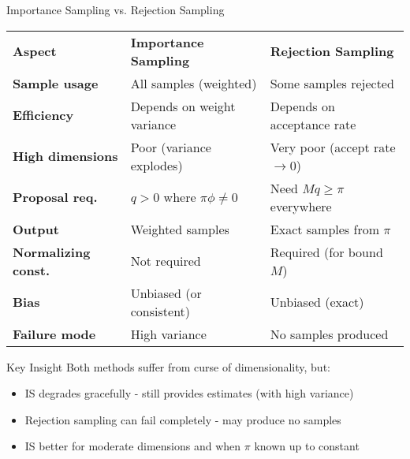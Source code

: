\documentclass[aspectratio=169]{beamer}
\begin{document}
\begin{frame}{Importance Sampling vs. Rejection Sampling}
	\begin{center}
		\small
		\begin{tabular}{lll}
			\textbf{Aspect}             & \textbf{Importance Sampling}   & \textbf{Rejection Sampling}     \\
			\textbf{Sample usage}       & All samples (weighted)         & Some samples rejected           \\
			\textbf{Efficiency}         & Depends on weight variance     & Depends on acceptance rate      \\
			\textbf{High dimensions}    & Poor (variance explodes)       & Very poor (accept rate $\to 0$) \\
			\textbf{Proposal req.}      & $q > 0$ where $\pi\phi \neq 0$ & Need $Mq \geq \pi$ everywhere   \\
			\textbf{Output}             & Weighted samples               & Exact samples from $\pi$        \\
			\textbf{Normalizing const.} & Not required                   & Required (for bound $M$)        \\
			\textbf{Bias}               & Unbiased (or consistent)       & Unbiased (exact)                \\
			\textbf{Failure mode}       & High variance                  & No samples produced             \\
		\end{tabular}
	\end{center}

	\vspace{0.5cm}
	\begin{block}{Key Insight}
		Both methods suffer from curse of dimensionality, but:
		\begin{itemize}
			\item IS degrades gracefully - still provides estimates (with high variance)
			\item Rejection sampling can fail completely - may produce no samples
			\item IS better for moderate dimensions and when $\pi$ known up to constant
		\end{itemize}
	\end{block}
\end{frame}

\end{document}
